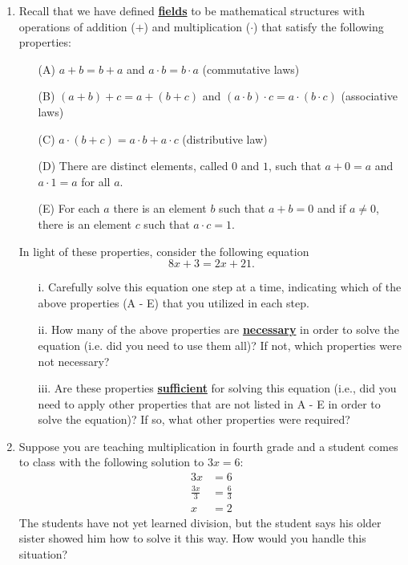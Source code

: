 \documentclass[11pt]{article}
\renewcommand\emph[1]{\underline{\bf{#1}}} %
\theoremstyle{definition}
\begin{document}
\begin{enumerate}
\item   Recall that we have defined \emph{fields} to be mathematical structures with operations of addition ($+$) and multiplication ($\cdot$) that satisfy the following properties:
  \begin{itemize}
    \item[(A)] $a+b=b+a$ and $a\cdot b=b\cdot a$ (commutative laws)
    \item[(B)] $(a+b)+c = a + (b+c)$ and $(a\cdot b)\cdot c = a\cdot (b \cdot c)$ (associative laws)
    \item[(C)] $a\cdot (b+c) = a\cdot b + a \cdot c$ (distributive law)
    \item[(D)] There are distinct elements, called $0$ and $1$, such that $a+0 = a $ and $a \cdot 1 = a$ for all $a$.
    \item[(E)] For each $a$ there is an element $b$ such that $a + b = 0$ and if $a\neq 0$, there is an element $c$ such that $a\cdot c = 1$.
  \end{itemize}
  In light of these properties, consider the following equation       
      \[8x+3=2x+21.\]
  \begin{itemize}
    \item[i.] Carefully solve this equation one step at a time, indicating which of the above properties (A - E) that you utilized in each step. 
    \item[ii.]How many of the above properties are \emph{necessary} in order to solve the equation (i.e. did you need to use them all)? If not, which properties were not necessary?
    \item[iii.] Are these properties \emph{sufficient} for solving this equation (i.e., did you need to apply other properties that are not listed in A - E in order to solve the equation)? If so, what other properties were required? 
  \end{itemize}

\item Suppose you are teaching multiplication in fourth grade and a student comes to class with the following solution to $3x=6$:
  \begin{align*}
    3x &= 6\\
    \frac{3x}{3} &= \frac{6}{3}\\
    x &= 2
  \end{align*}
  The students have not yet learned division, but the student says his older sister showed him how to solve it this way. How would you handle this situation?


\end{enumerate}
\end{document}
